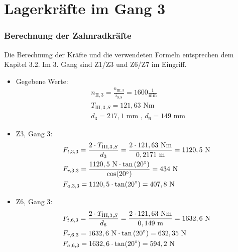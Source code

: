 \section{Lagerkräfte im Gang 3}
\subsubsection{Berechnung der Zahnradkräfte}
Die Berechnung der Kräfte und die verwendeten Formeln entsprechen dem Kapitel 3.2. Im 3. Gang sind Z1/Z3 und Z6/Z7 im Eingriff.
\begin{itemize}
	\item Gegebene Werte: 
	\begin{align*}
	&n_{\mathrm{II},3} = \frac{n_{\mathrm{III},3}}{i_{9,8}} = 1600\frac{1}{\text{min}} \\
	&T_{\mathrm{III},3,S} = 121,63\text{ Nm} \\	
	&d_3 = 217,1\text{ mm} \text{ , } d_6 = 149 \text{ mm } 
	\end{align*}
	\item Z3, Gang 3:
	\begin{align*} 
	&F_{t,3,3} = \frac{2\cdot T_{\mathrm{III},3,S}}{d_3} = \frac{2 \cdot 121,63 \text{ Nm}}{0,2171 \text{ m}} = 1120,5 \text{ N}\\ 
	&F_{r,3,3} = \frac{1120,5 \text{ N} \cdot \tan{(20^\circ)}}{\cos(20^\circ)} =434\text{ N}\\ 
	&F_{a,3,3} =1120,5 \cdot \tan(20^\circ) =407,8 \text{ N}
	\end{align*}
	\item Z6, Gang 3:
	\begin{align*}
	&F_{t,6,3} = \frac{2\cdot T_{\mathrm{III},3,S}}{d_6} = \frac{2 \cdot 121,63 \text{ Nm}}{0,149 \text{ m}} = 1632,6\text{ N}\\ 
	&F_{r,6,3} = 1632,6 \text{ N} \cdot \tan{(20^\circ)} = 632,35\text{ N}\\ 
	&F_{a,6,3} =1632,6\cdot \tan(20^\circ) =594,2 \text{ N}
	\end{align*}
\end{itemize}
